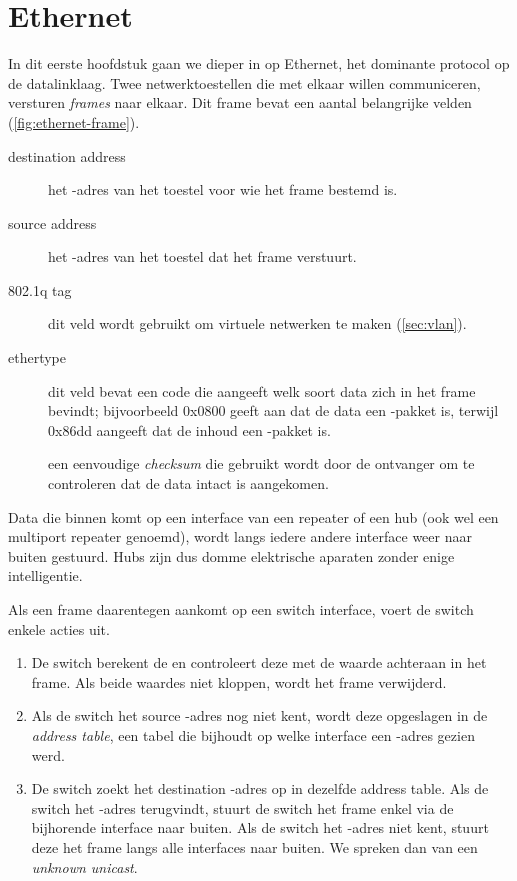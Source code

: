 \chapter{Ethernet}
\label{chap:ethernet}

In dit eerste hoofdstuk gaan we dieper in op Ethernet, het dominante protocol op de datalinklaag.
Twee netwerktoestellen die met elkaar willen communiceren, versturen \emph{frames} naar elkaar.
Dit frame bevat een aantal belangrijke velden (\cref{fig:ethernet-frame}).
\begin{description}
    \item[destination address]
    het -adres van het toestel voor wie het frame bestemd is.
    
    \item[source address]
    het -adres van het toestel dat het frame verstuurt.
    
    \item[802.1q tag]
    dit veld wordt gebruikt om virtuele netwerken te maken (\vref{sec:vlan}).
    
    \item[ethertype]
    dit veld bevat een code die aangeeft welk soort data zich in het frame bevindt; bijvoorbeeld 0x0800 geeft aan dat de data een -pakket is, terwijl 0x86dd aangeeft dat de inhoud een -pakket is.
    
    \item[]
    een eenvoudige \emph{checksum} die gebruikt wordt door de ontvanger om te controleren dat de data intact is aangekomen.
\end{description}

Data die binnen komt op een interface van een repeater of een hub (ook wel een multiport repeater genoemd), wordt langs iedere andere interface weer naar buiten gestuurd.
Hubs zijn dus domme elektrische aparaten zonder enige intelligentie.

Als een frame daarentegen aankomt op een switch interface, voert de switch enkele acties uit.
\begin{enumerate}
    \item
    De switch berekent de  en controleert deze met de waarde achteraan in het frame. Als beide waardes niet kloppen, wordt het frame verwijderd.
    
    \item
    Als de switch het source -adres nog niet kent, wordt deze opgeslagen in de  \emph{address table}, een tabel die bijhoudt op welke interface een -adres gezien werd.
    
    \item
    De switch zoekt het destination -adres op in dezelfde  address table.
    Als de switch het -adres terugvindt, stuurt de switch het frame enkel via de bijhorende interface naar buiten.
    Als de switch het -adres niet kent, stuurt deze het frame langs alle interfaces naar buiten.
    We spreken dan van een \emph{unknown unicast}.
\end{enumerate}

